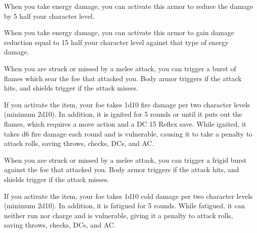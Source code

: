 
 When you take energy damage, you can activate this armor to reduce the damage by 5 \add half your character level.


 When you take energy damage, you can activate this armor to gain damage reduction equal to 15 \add half your character level against that type of energy damage.


 When you are struck or missed by a melee attack, you can trigger a burst of flames which sear the foe that attacked you. Body armor triggers if the attack hits, and shields trigger if the attack misses.

If you activate the item, your foe takes 1d10 fire damage per two character levels (minimum 2d10). In addition, it is ignited for 5 rounds or until it puts out the flames, which requires a move action and a DC 15 Reflex save. While ignited, it takes d6 fire damage each round and is vulnerable, causing it to take a  penalty to attack rolls, saving throws, checks, DCs, and AC.


 When you are struck or missed by a melee attack, you can trigger a frigid burst against the foe that attacked you. Body armor triggers if the attack hits, and shields trigger if the attack misses.

If you activate the item, your foe takes 1d10 cold damage per two character levels (minimum 2d10). In addition, it is fatigued for 5 rounds. While fatigued, it can neither run nor charge and is vulnerable, giving it a  penalty to attack rolls, saving throws, checks, DCs, and AC.


